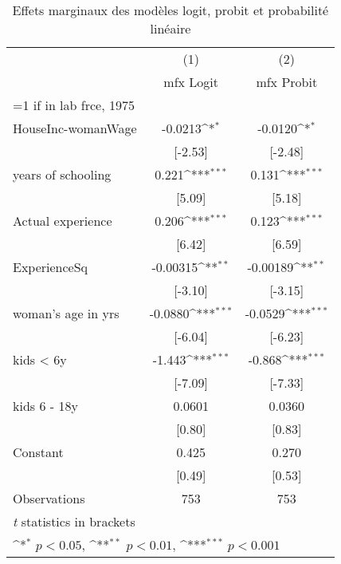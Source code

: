 {
\def\sym#1{\ifmmode^{#1}\else\(^{#1}\)\fi}
\begin{longtable}{l*{2}{c}}
\caption{Effets marginaux des modèles logit, probit et probabilité linéaire}\\
\hline\hline\endfirsthead\hline\endhead\hline\endfoot\endlastfoot
                    &\multicolumn{1}{c}{(1)}&\multicolumn{1}{c}{(2)}\\
                    &\multicolumn{1}{c}{mfx Logit}&\multicolumn{1}{c}{mfx Probit}\\
\hline
=1 if in lab frce, 1975&                     &                     \\
HouseInc-womanWage  &     -0.0213\sym{*}  &     -0.0120\sym{*}  \\
                    &     [-2.53]         &     [-2.48]         \\
[1em]
years of schooling  &       0.221\sym{***}&       0.131\sym{***}\\
                    &      [5.09]         &      [5.18]         \\
[1em]
Actual experience   &       0.206\sym{***}&       0.123\sym{***}\\
                    &      [6.42]         &      [6.59]         \\
[1em]
ExperienceSq        &    -0.00315\sym{**} &    -0.00189\sym{**} \\
                    &     [-3.10]         &     [-3.15]         \\
[1em]
woman's age in yrs  &     -0.0880\sym{***}&     -0.0529\sym{***}\\
                    &     [-6.04]         &     [-6.23]         \\
[1em]
kids < 6y           &      -1.443\sym{***}&      -0.868\sym{***}\\
                    &     [-7.09]         &     [-7.33]         \\
[1em]
kids 6 - 18y        &      0.0601         &      0.0360         \\
                    &      [0.80]         &      [0.83]         \\
[1em]
Constant            &       0.425         &       0.270         \\
                    &      [0.49]         &      [0.53]         \\
\hline
Observations        &         753         &         753         \\
\hline\hline
\multicolumn{3}{l}{\footnotesize \textit{t} statistics in brackets}\\
\multicolumn{3}{l}{\footnotesize \sym{*} \(p<0.05\), \sym{**} \(p<0.01\), \sym{***} \(p<0.001\)}\\
\end{longtable}
}
